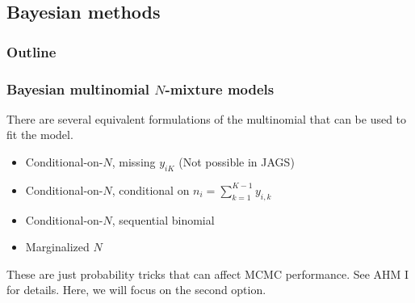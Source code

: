 \documentclass[color=usenames,dvipsnames]{beamer}\usepackage[]{graphicx}\usepackage[]{xcolor}
\begin{document}
\subsection{Bayesian methods}


\begin{frame}
  \frametitle{Outline}
  \Large
\end{frame}


\begin{frame}
  \frametitle{Bayesian multinomial $N$-mixture models}
  There are several equivalent formulations of the multinomial that
  can be used to fit the model. \\  
  \begin{itemize}
    \item Conditional-on-$N$, missing $y_{iK}$ (Not possible in JAGS)
    \item Conditional-on-$N$, conditional on $n_i=\sum_{k=1}^{K-1} y_{i,k}$
    \item Conditional-on-$N$, sequential binomial
    \item Marginalized $N$
  \end{itemize}
  \pause
  \vfill
  These are just probability tricks that can affect MCMC
  performance. See AHM I for details. Here, we will focus on the second
  option. \\ 
\end{frame}









\end{document}
